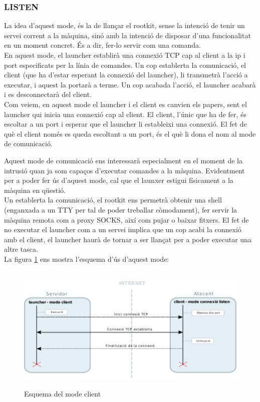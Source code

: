 \subsubsection{LISTEN}
La idea d'aquest mode, és la de llançar el rootkit, sense la intenció de tenir un servei corrent
a la màquina, sinó amb la intenció de disposar d'una funcionalitat en un moment concret. És a dir, fer-lo servir
com una comanda.\\

En aquest mode, el launcher establirà una connexió TCP cap al client a la ip i port especificats per la línia
de comandes. Un cop establerta la comunicació, el client (que ha d'estar esperant la connexió del launcher), 
li transmetrà l'acció a executar, i aquest la portarà a terme. Un cop acabada l'acció, el launcher acabarà
i es desconnectarà del client. \\

Com veiem, en aquest mode el launcher i el client es canvien els papers, sent el launcher qui inicia una connexió 
cap al client. El client, l'únic que ha de fer, és escoltar a un port i esperar que el launcher li estableixi
una connexió. El fet de què el client només es queda escoltant a un port, és el què li dona el nom al mode de
comunicació.

Aquest mode de comunicació ens interessarà especialment en el moment de la intrusió quan ja som capaços d'executar
comandes a la màquina. Evidentment per a poder fer ús d'aquest mode, cal que el launxer estigui físicament
a la màquina en qüestió. \\

Un establerta la comunicació, el rootkit ens permetrà obtenir una shell (enganxada a un TTY per tal de poder treballar 
còmodament), fer servir la màquina remota com a proxy SOCKS, així com pujar o baixar fitxers. El fet de no executar el 
launcher com a un servei implica que un cop acabi la connexió amb el client, el launcher haurà de tornar a ser llançat 
per a poder executar una altre tasca. \\

La figura \ref{fig:modeClient} ens mostra l'esquema d'ús d'aquest mode: \\
\\
\begin{figure}[htp]
    \centering
    \includegraphics[scale=1,keepaspectratio]{diagrames/solutionDesignClientMode.pdf} \\
    \caption{Esquema del mode client}
    \label{fig:modeClient}
\end{figure}

